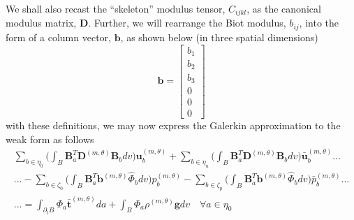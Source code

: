 \documentclass[11pt]{article} %
\begin{document}
We shall also recast the ``skeleton'' modulus tensor, $C_{ijkl}$, as the canonical modulus matrix, $\mathbf{D}$. Further, we will rearrange the Biot modulus, $b_{ij}$, into the form of a column vector, $\mathbf{b}$, as shown below (in three spatial dimensions)
\begin{equation}
	\mathbf{b} = \left[
	\begin{array}{c}
		b_1 \\
		b_2 \\
		b_3 \\
		0 \\
		0 \\
		0
	\end{array} \right]
\end{equation}
with these definitions, we may now express the Galerkin approximation to the weak form as follows
\begin{eqnarray}
	 \sum_{b \in \eta_0} \bigg( \int_B \mathbf{B}_a^T \mathbf{D}^{(m,\theta)} \mathbf{B}_b dv \bigg) \mathbf{u}_b^{(m,\theta)} + \sum_{b \in \eta_u} \bigg( \int_B \mathbf{B}_a^T \mathbf{D}^{(m,\theta)} \mathbf{B}_b dv \bigg) \bar{\mathbf{u}}_b^{(m,\theta)} ... \nonumber \\
	... - \sum_{b \in \zeta_0} \bigg( \int_B \mathbf{B}_a^T \mathbf{b}^{(m,\theta)} \hat{\Phi}_b dv \bigg) p_b^{(m,\theta)} - \sum_{b \in \zeta_p} \bigg( \int_B \mathbf{B}_a^T \mathbf{b}^{(m,\theta)} \hat{\Phi}_b dv \bigg) \bar{p}_b^{(m,\theta)} ... \nonumber \\
	... = \int_{\partial_t B} \Phi_a \bar{\mathbf{t}}^{(m,\theta)} da + \int_B \Phi_a \rho^{(m,\theta)} \mathbf{g} dv \quad \forall a \in \eta_0
\end{eqnarray}
\end{document}
